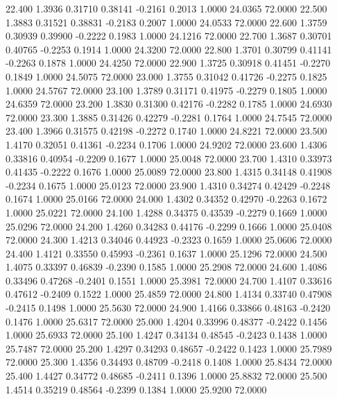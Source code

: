   22.400   1.3936   0.31710   0.38141  -0.2161   0.2013   1.0000  24.0365  72.0000
  22.500   1.3883   0.31521   0.38831  -0.2183   0.2007   1.0000  24.0533  72.0000
  22.600   1.3759   0.30939   0.39900  -0.2222   0.1983   1.0000  24.1216  72.0000
  22.700   1.3687   0.30701   0.40765  -0.2253   0.1914   1.0000  24.3200  72.0000
  22.800   1.3701   0.30799   0.41141  -0.2263   0.1878   1.0000  24.4250  72.0000
  22.900   1.3725   0.30918   0.41451  -0.2270   0.1849   1.0000  24.5075  72.0000
  23.000   1.3755   0.31042   0.41726  -0.2275   0.1825   1.0000  24.5767  72.0000
  23.100   1.3789   0.31171   0.41975  -0.2279   0.1805   1.0000  24.6359  72.0000
  23.200   1.3830   0.31300   0.42176  -0.2282   0.1785   1.0000  24.6930  72.0000
  23.300   1.3885   0.31426   0.42279  -0.2281   0.1764   1.0000  24.7545  72.0000
  23.400   1.3966   0.31575   0.42198  -0.2272   0.1740   1.0000  24.8221  72.0000
  23.500   1.4170   0.32051   0.41361  -0.2234   0.1706   1.0000  24.9202  72.0000
  23.600   1.4306   0.33816   0.40954  -0.2209   0.1677   1.0000  25.0048  72.0000
  23.700   1.4310   0.33973   0.41435  -0.2222   0.1676   1.0000  25.0089  72.0000
  23.800   1.4315   0.34148   0.41908  -0.2234   0.1675   1.0000  25.0123  72.0000
  23.900   1.4310   0.34274   0.42429  -0.2248   0.1674   1.0000  25.0166  72.0000
  24.000   1.4302   0.34352   0.42970  -0.2263   0.1672   1.0000  25.0221  72.0000
  24.100   1.4288   0.34375   0.43539  -0.2279   0.1669   1.0000  25.0296  72.0000
  24.200   1.4260   0.34283   0.44176  -0.2299   0.1666   1.0000  25.0408  72.0000
  24.300   1.4213   0.34046   0.44923  -0.2323   0.1659   1.0000  25.0606  72.0000
  24.400   1.4121   0.33550   0.45993  -0.2361   0.1637   1.0000  25.1296  72.0000
  24.500   1.4075   0.33397   0.46839  -0.2390   0.1585   1.0000  25.2908  72.0000
  24.600   1.4086   0.33496   0.47268  -0.2401   0.1551   1.0000  25.3981  72.0000
  24.700   1.4107   0.33616   0.47612  -0.2409   0.1522   1.0000  25.4859  72.0000
  24.800   1.4134   0.33740   0.47908  -0.2415   0.1498   1.0000  25.5630  72.0000
  24.900   1.4166   0.33866   0.48163  -0.2420   0.1476   1.0000  25.6317  72.0000
  25.000   1.4204   0.33996   0.48377  -0.2422   0.1456   1.0000  25.6933  72.0000
  25.100   1.4247   0.34134   0.48545  -0.2423   0.1438   1.0000  25.7487  72.0000
  25.200   1.4297   0.34293   0.48657  -0.2422   0.1423   1.0000  25.7989  72.0000
  25.300   1.4356   0.34493   0.48709  -0.2418   0.1408   1.0000  25.8434  72.0000
  25.400   1.4427   0.34772   0.48685  -0.2411   0.1396   1.0000  25.8832  72.0000
  25.500   1.4514   0.35219   0.48564  -0.2399   0.1384   1.0000  25.9200  72.0000
